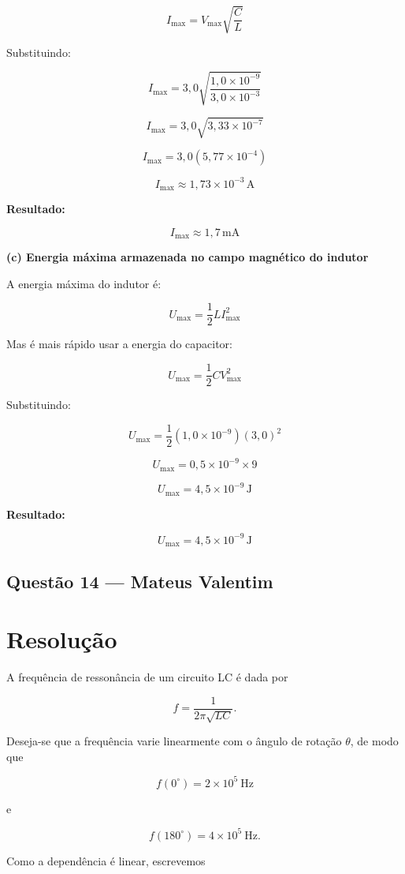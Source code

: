 \documentclass[12pt,a4paper]{article}
\begin{document}
\[
I_{\max} = V_{\max}\sqrt{\frac{C}{L}}
\]

Substituindo:

\[
I_{\max} = 3,0\sqrt{\frac{1,0 \times 10^{-9}}{3,0 \times 10^{-3}}}
\]

\[
I_{\max} = 3,0\sqrt{3,33 \times 10^{-7}}
\]

\[
I_{\max} = 3,0(5,77 \times 10^{-4})
\]

\[
I_{\max} \approx 1,73 \times 10^{-3}\,\text{A}
\]

\textbf{Resultado:}

\[
\boxed{I_{\max} \approx 1,7\,\text{mA}}
\]

\textbf{(c) Energia máxima armazenada no campo magnético do indutor}

A energia máxima do indutor é:

\[
U_{\max} = \frac{1}{2}LI_{\max}^{2}
\]

Mas é mais rápido usar a energia do capacitor:

\[
U_{\max} = \frac{1}{2}CV_{\max}^{2}
\]

Substituindo:

\[
U_{\max} = \frac{1}{2}(1,0 \times 10^{-9})(3,0)^2
\]

\[
U_{\max} = 0,5 \times 10^{-9} \times 9
\]

\[
U_{\max} = 4,5 \times 10^{-9}\,\text{J}
\]

\textbf{Resultado:}

\[
\boxed{U_{\max} = 4,5 \times 10^{-9}\,\text{J}}
\]

\subsection{Questão 14 — Mateus Valentim}
\section*{Resolução}

A frequência de ressonância de um circuito LC é dada por

\[
f=\frac{1}{2\pi\sqrt{LC}}.
\]

Deseja-se que a frequência varie linearmente com o ângulo de rotação \(\theta\), de modo que

\[
f(0^\circ)=2\times10^5\ \text{Hz}
\]

e

\[
f(180^\circ)=4\times10^5\ \text{Hz}.
\]

Como a dependência é linear, escrevemos
\end{document}
